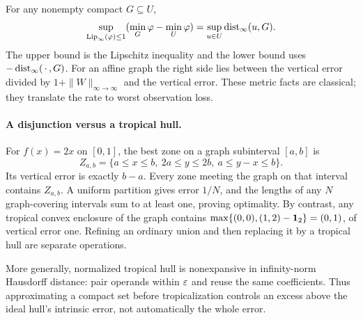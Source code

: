 For any nonempty compact $G\subseteq U$,
\[
\sup_{\operatorname{Lip}_\infty(\varphi)\le1}(\min_G\varphi-\min_U\varphi)
=\sup_{u\in U}\operatorname{dist}_\infty(u,G).
\]
The upper bound is the Lipschitz inequality and the lower bound uses $-\operatorname{dist}_\infty(\,\cdot\,,G)$. For an affine graph the right side lies between the vertical error divided by $1+\|W\|_{\infty\to\infty}$ and the vertical error. These metric facts are classical; they translate the rate to worst observation loss.

\paragraph{A disjunction versus a tropical hull.}
For $f(x)=2x$ on $[0,1]$, the best zone on a graph subinterval $[a,b]$ is
\[
Z_{a,b}=\{a\le x\le b,\ 2a\le y\le2b,\ a\le y-x\le b\}.
\]
Its vertical error is exactly $b-a$. Every zone meeting the graph on that interval contains $Z_{a,b}$. A uniform partition gives error $1/N$, and the lengths of any $N$ graph-covering intervals sum to at least one, proving optimality. By contrast, any tropical convex enclosure of the graph contains
$\max\{(0,0),(1,2)-\mathbf 1_2\}=(0,1)$,
of vertical error one. Refining an ordinary union and then replacing it by a tropical hull are separate operations.

More generally, normalized tropical hull is nonexpansive in infinity-norm Hausdorff distance: pair operands within $\varepsilon$ and reuse the same coefficients. Thus approximating a compact set before tropicalization controls an excess above the ideal hull's intrinsic error, not automatically the whole error.
